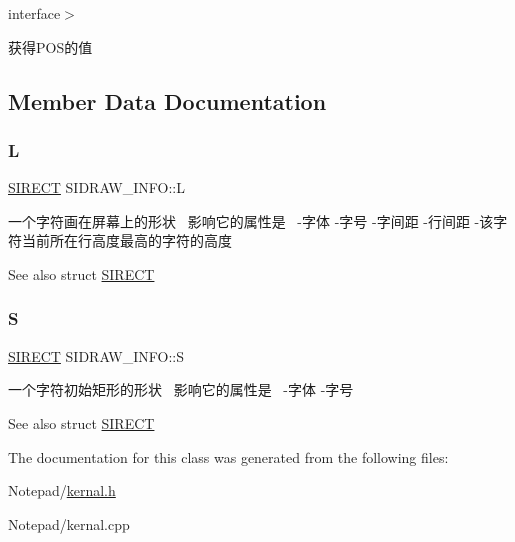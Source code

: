 interface$>$ 

获得\+P\+O\+S的值 

\subsection{Member Data Documentation}
\mbox{\label{class_s_i_d_r_a_w___i_n_f_o_a41065961d296d245790773771670aae2}} 
\subsubsection{\texorpdfstring{L}{L}}
{\footnotesize\ttfamily \hyperlink{struct_s_i_r_e_c_t}{S\+I\+R\+E\+CT} S\+I\+D\+R\+A\+W\+\_\+\+I\+N\+F\+O\+::L}



一个字符画在屏幕上的形状~\newline
影响它的属性是~\newline
 -\/字体 -\/字号 -\/字间距 -\/行间距 -\/该字符当前所在行高度最高的字符的高度 

\begin{DoxySeeAlso}{See also}
struct \hyperlink{struct_s_i_r_e_c_t}{S\+I\+R\+E\+CT} 
\end{DoxySeeAlso}
\mbox{\label{class_s_i_d_r_a_w___i_n_f_o_a495fac5bcc54e4b58d500a7117fde9d9}} 
\subsubsection{\texorpdfstring{S}{S}}
{\footnotesize\ttfamily \hyperlink{struct_s_i_r_e_c_t}{S\+I\+R\+E\+CT} S\+I\+D\+R\+A\+W\+\_\+\+I\+N\+F\+O\+::S}



一个字符初始矩形的形状~\newline
影响它的属性是~\newline
 -\/字体 -\/字号 

\begin{DoxySeeAlso}{See also}
struct \hyperlink{struct_s_i_r_e_c_t}{S\+I\+R\+E\+CT} 
\end{DoxySeeAlso}


The documentation for this class was generated from the following files\+:\begin{DoxyCompactItemize}
\item 
Notepad/\hyperlink{kernal_8h}{kernal.\+h}\item 
Notepad/kernal.\+cpp\end{DoxyCompactItemize}
